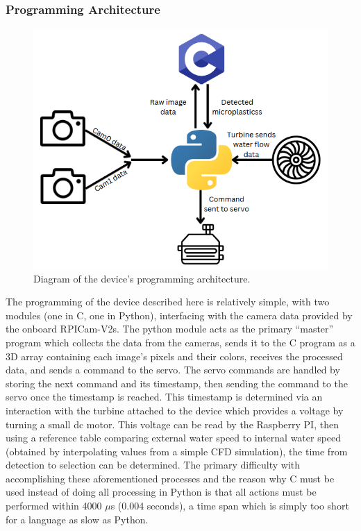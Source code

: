 \documentclass[fleqn,10pt]{SelfArx} %
\begin{document}
		
	\subsubsection{Programming Architecture}\label{sec:programmingArch}
	\begin{figure}[h]
		\centering
		\includegraphics[width=1\linewidth]{Figures/ProgrammingArch}
		\caption[Programming Architecture Diagram]{Diagram of the device's programming architecture.}
		\label{fig:ProgArch}
	\end{figure} 
		The programming of the device described here is relatively simple, with two modules (one in C, one in Python), interfacing with the camera data provided by the onboard RPICam-V2s. The python module acts as the primary “master” program which collects the data from the cameras, sends it to the C program as a 3D array containing each image’s pixels and their colors, receives the processed data, and sends a command to the servo. The servo commands are handled by storing the next command and its timestamp, then sending the command to the servo once the timestamp is reached. This timestamp is determined via an interaction with the turbine attached to the device which provides a voltage by turning a small dc motor. This voltage can be read by the Raspberry PI, then using a reference table comparing external water speed to internal water speed (obtained by interpolating values from a simple CFD simulation), the time from detection to selection can be determined. The primary difficulty with accomplishing these aforementioned processes and the reason why C must be used instead of doing all processing in Python is that all actions must be performed within 4000 $\mu$s (0.004 seconds), a time span which is simply too short for a language as slow as Python. 
	
\end{document}
